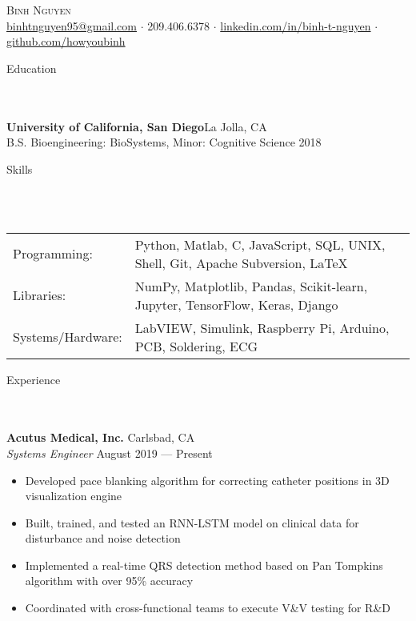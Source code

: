 \documentclass{article}
\newcommand{\lineunder} {
    \vspace*{-8pt} \\
    \hspace*{-18pt} \hrulefill \\
}
\newcommand{\header} [1] {
    {\hspace*{-18pt}\vspace*{6pt} \Large{#1} }
    \vspace*{-6pt} 
    \lineunder
}
\begin{document}
\vspace*{-40pt}

  

\begin{center}
	{\Huge \scshape {Binh Nguyen}}\\
	\href{mailto:binhtnguyen95@gmail.com}{binhtnguyen95@gmail.com} $\cdot$ 
	209.406.6378 $\cdot$ 
	\href{https://www.linkedin.com/in/binh-t-nguyen}{linkedin.com/in/binh-t-nguyen} $\cdot$ 
	\href{https://www.github.com/howyoubinh}{github.com/howyoubinh}\\
\end{center}

\header{Education}
\textbf{University of California, San Diego}\hfill La Jolla, CA\\
B.S. Bioengineering: BioSystems, Minor: Cognitive Science \hfill 2018\\
\vspace{2mm}

\header{Skills}
\vspace{1mm}
\begin{tabular}{ l l }
	Programming: & Python, Matlab, C, JavaScript, SQL, UNIX, Shell, Git, Apache Subversion, \LaTeX \\
	Libraries:   & NumPy, Matplotlib, Pandas, Scikit-learn, Jupyter, TensorFlow, Keras, Django \\
	Systems/Hardware:    & LabVIEW, Simulink, Raspberry Pi, Arduino, PCB, Soldering, ECG \\
\end{tabular}

\header{Experience}

\textbf{Acutus Medical, Inc.} \hfill Carlsbad, CA\\
\textit{Systems Engineer} \hfill August 2019 --- Present\\
\vspace{-2mm}
\begin{itemize} \itemsep 0.05pt
	\item Developed pace blanking algorithm for correcting catheter positions in 3D visualization engine
	\item Built, trained, and tested an RNN-LSTM model on clinical data for disturbance and noise detection
	\item Implemented a real-time QRS detection method based on Pan Tompkins algorithm with over 95\% accuracy
	\item Coordinated with cross-functional teams to execute V\&V testing for R\&D
\end{itemize}
\end{document}
